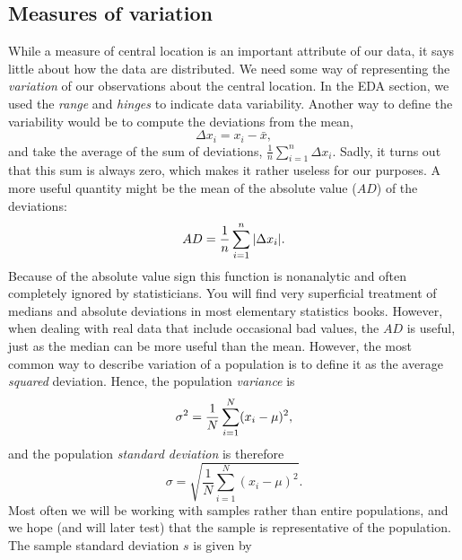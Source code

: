 \subsection{Measures of variation}

	While a measure of central location is an important attribute of our data, it says little 
about how the data are distributed.  We need some way of representing the \emph{variation} of our 
observations about the central location.  In the EDA section, we used the \emph{range} and \emph{hinges} to 
indicate data variability.  Another way to define the variability would be to compute the 
deviations from the mean,
\begin{equation}
\Delta x_i = x_i - \bar{x},
\end{equation}
and take the average of the sum of deviations, $\frac{1}{n}\displaystyle \sum^n_{i=1} \Delta x_i$.
Sadly, it turns out that this sum is 
always zero, which makes it rather useless for our purposes.  A more useful quantity might be the 
mean of the absolute value ($AD$) of the deviations:
\begin{equation}
	\index{AD (Absolute value of deviation)}
	\index{Deviation!absolute value}
	\index{Absolute value of deviation (AD)}
AD = \frac{1}{n} \sum^n _{i=1} | \Delta x_i |.
\label{eq:AD}
\end{equation}
Because of the absolute value sign this function is nonanalytic and often completely ignored by 
statisticians.  You will find very superficial treatment of medians and absolute deviations in most 
elementary statistics books.  However, when dealing with real data that include occasional bad 
values, the $AD$ is useful, just as the median can be more useful than the mean.  However, the most 
common way to describe variation of a population is to define it as the average \emph{squared} 
deviation.  Hence, the population \emph{variance} is
\begin{equation}
	\index{Variance}
	\index{Data!variance}
	\index{Population!variance}
\sigma^2 = \frac{1}{N} \sum^N _{i=1} (x_i - \mu)^2,
\end{equation}
and the population \emph{standard deviation} is therefore
\begin{equation}
\sigma = \sqrt{ \frac{1}{N} \sum^N_{i=1} (x_i - \mu) ^2}.
\end{equation}
Most often we will be working with samples rather than entire populations, and we hope (and will later test)
that the sample is representative of the population.
The sample standard deviation $s$ is given by
